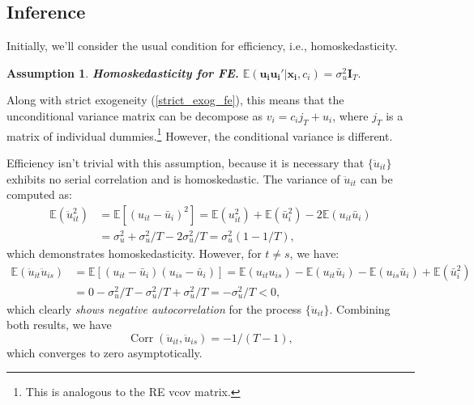 \documentclass[11pt, a4paper]{report}
\theoremstyle{plain}
\newtheorem{assump}[thm]{Assumption}
\theoremstyle{plain}
\theoremstyle{remark}
\begin{document}
\subsection{Inference}

Initially, we'll consider the usual condition for efficiency, i.e., homoskedasticity.

\begin{assump} \textbf{Homoskedasticity for FE.}
   $ \mathbb{E}(\mathbf{u_i u_i' | x_i}, c_i) = \sigma_u^2 \mathbf{I}_T.$ \label{homosk_fe}
\end{assump}

Along with strict exogeneity (\ref{strict_exog_fe}), this means that the unconditional variance matrix can be decompose as $v_i = c_i j_T + u_i$, where $j_T$ is a matrix of individual dummies.\footnote{This is analogous to the RE vcov matrix.} However, the conditional variance is different.

Efficiency isn't trivial with this assumption, because it is necessary that $\{\ddot{u}_{it}\}$ exhibits no serial correlation and is homoskedastic. The variance of $\ddot{u}_{it}$ can be computed as:
\begin{equation}
    \begin{aligned}
    \mathbb{E}\left(\ddot{u}_{i t}^{2}\right) &=\mathbb{E}\left[\left(u_{i t}-\bar{u}_{i}\right)^{2}\right]=\mathbb{E}\left(u_{i t}^{2}\right)+\mathbb{E}\left(\bar{u}_{i}^{2}\right)-2 \mathbb{E}\left(u_{i t} \bar{u}_{i}\right) \\
    &=\sigma_{u}^{2}+\sigma_{u}^{2} / T-2 \sigma_{u}^{2} / T=\sigma_{u}^{2}(1-1 / T),
    \end{aligned}
    \end{equation}
which demonstrates homoskedasticity. However, for $t \neq s$, we have: 
\begin{equation}
    \begin{aligned}
    \mathbb{E}\left(\ddot{u}_{i t} \ddot{u}_{i s}\right) &=\mathbb{E}\left[\left(u_{i t}-\bar{u}_{i}\right)\left(u_{i s}-\bar{u}_{i}\right)\right]=\mathbb{E}\left(u_{i t} u_{i s}\right)-\mathbb{E}\left(u_{i t} \bar{u}_{i}\right)-\mathbb{E}\left(u_{i s} \bar{u}_{i}\right)+\mathbb{E}\left(\bar{u}_{i}^{2}\right) \\
    &=0-\sigma_{u}^{2} / T-\sigma_{u}^{2} / T+\sigma_{u}^{2} / T=-\sigma_{u}^{2} / T<0,
    \end{aligned}
    \end{equation}
which clearly \textit{shows negative autocorrelation} for the process $\{\ddot{u}_{it}\}$. Combining both results, we have
\begin{equation}
    \operatorname{Corr}\left(\ddot{u}_{i t}, \ddot{u}_{i s}\right)=-1 /(T-1),
\end{equation}
which converges to zero asymptotically. 
\end{document}
